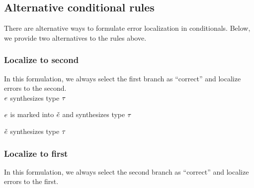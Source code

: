 \documentclass[formalism.tex]{subfiles}
\begin{document}
\subsection{Alternative conditional rules}
\label{sec:marked-alternative-conditionals}
There are alternative ways to formulate error localization in conditionals. Below, we provide two
alternatives to the rules above.

\subsubsection{Localize to second}
\label{sec:marked-alternative-conditionals-localize-second}
In this formulation, we always select the first branch as ``correct'' and localize errors to the
second. \\

\judgbox{\ctxSynTypeU{\ctx}{\EMV}{\TMV}} $\EMV$ synthesizes type $\TMV$
%
\begin{mathpar}
\end{mathpar}

\judgbox{\ctxSynFixedInto{\ctx}{\EMV}{\ECMV}{\TMV}} $\EMV$ is marked into $\ECMV$ and synthesizes type $\TMV$
%
\begin{mathpar}
\end{mathpar}

\judgbox{\ctxSynTypeM{\ctx}{\ECMV}{\TMV}} $\ECMV$ synthesizes type $\TMV$
%
\begin{mathpar}
\end{mathpar}

\subsubsection{Localize to first}
\label{sec:marked-alternative-conditionals-localize-first}
In this formulation, we always select the second branch as ``correct'' and localize errors to the
first. \\
\end{document}
